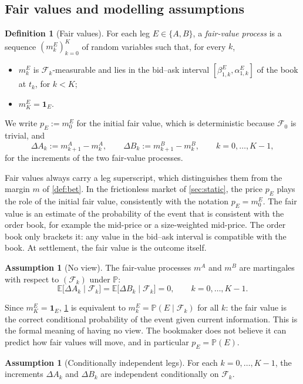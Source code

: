\documentclass[11pt,a4paper]{article}
\theoremstyle{plain}
\theoremstyle{definition}
\newtheorem{definition}[theorem]{Definition}
\newtheorem{assumption}[theorem]{Assumption}
\theoremstyle{remark}
\newcommand{\E}{\mathbb{E}}
\newcommand{\Prob}{\mathbb{P}}
\newcommand{\1}{\mathbf{1}}
\newcommand{\F}{\mathcal{F}}
\begin{document}
\subsection{Fair values and modelling assumptions}

\begin{definition}[Fair values]
\label{def:fair}
For each leg $E\in\{A,B\}$, a \emph{fair-value process} is a sequence $(m^E_k)_{k=0}^K$ of random variables such that, for every $k$,
\begin{itemize}
  \item $m^E_k$ is $\F_k$-measurable and lies in the bid--ask interval $[\beta^E_{1,k},\alpha^E_{1,k}]$ of the book at $t_k$, for $k<K$;
  \item $m^E_K = \1_E$.
\end{itemize}
We write $p_E := m^E_0$ for the initial fair value, which is deterministic because $\F_0$ is trivial, and
\[
\Delta A_k := m^A_{k+1}-m^A_k,\qquad \Delta B_k := m^B_{k+1}-m^B_k,\qquad k=0,\dots,K-1,
\]
for the increments of the two fair-value processes.
\end{definition}

Fair values always carry a leg superscript, which distinguishes them from the margin $m$ of \cref{def:bet}. In the frictionless market of \cref{sec:static}, the price $p_E$ plays the role of the initial fair value, consistently with the notation $p_E = m^E_0$. The fair value is an estimate of the probability of the event that is consistent with the order book, for example the mid-price or a size-weighted mid-price. The order book only brackets it: any value in the bid--ask interval is compatible with the book. At settlement, the fair value is the outcome itself.

\begin{assumption}[No view]
\label{ass:martingale}
The fair-value processes $m^A$ and $m^B$ are martingales with respect to $(\F_k)$ under $\Prob$:
\[
\E\bigl[\Delta A_k\mid\F_k\bigr] = \E\bigl[\Delta B_k\mid\F_k\bigr] = 0,\qquad k=0,\dots,K-1.
\]
\end{assumption}

Since $m^E_K = \1_E$, \cref{ass:martingale} is equivalent to $m^E_k = \Prob(E\mid\F_k)$ for all $k$: the fair value is the correct conditional probability of the event given current information. This is the formal meaning of having no view. The bookmaker does not believe it can predict how fair values will move, and in particular $p_E = \Prob(E)$.

\begin{assumption}[Conditionally independent legs]
\label{ass:independence}
For each $k=0,\dots,K-1$, the increments $\Delta A_k$ and $\Delta B_k$ are independent conditionally on $\F_k$.
\end{assumption}
\end{document}
